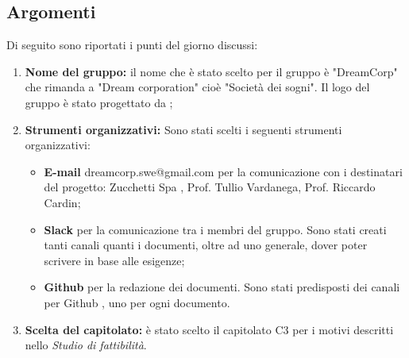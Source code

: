 \documentclass[12pt]{article}
\begin{document}
    \subsection{Argomenti}
        Di seguito sono riportati i punti del giorno discussi:
    \begin{enumerate}
        \item \textbf{Nome del gruppo:} il nome che è stato scelto per il gruppo è "DreamCorp" che rimanda a "Dream corporation" cioè "Società dei sogni". Il logo del gruppo è stato progettato da \daG;
        \item \textbf{Strumenti organizzativi:} Sono stati scelti i seguenti strumenti organizzativi: 
        \begin{itemize}
            \item \textbf{E-mail} dreamcorp.swe@gmail.com per la comunicazione con i destinatari del progetto: Zucchetti Spa \pedice , Prof. Tullio Vardanega, Prof. Riccardo Cardin; 
            \item \textbf{Slack} per la comunicazione tra i membri del gruppo. Sono stati creati tanti canali quanti i documenti, oltre ad uno generale, dover poter scrivere in base alle esigenze;
            \item \textbf{Github} \pedice per la redazione dei documenti. Sono stati predisposti dei canali per Github \pedice, uno per ogni documento.
        \end{itemize}
        \item \textbf{Scelta del capitolato:} è stato scelto il capitolato C3 per i motivi descritti nello \textit{Studio di fattibilità}. 
    \end{enumerate}
\end{document}
